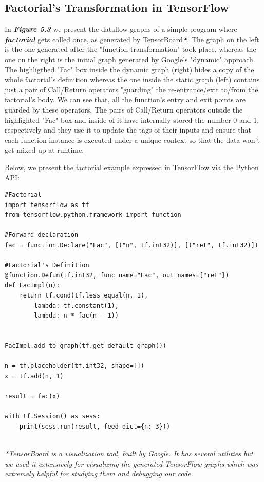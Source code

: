 \documentclass[ack,preface]{dithesis}
\begin{document}
    \subsection{Factorial's Transformation  in TensorFlow}
In  \textit{\textbf{Figure 5.3}} we present the dataflow graphs of a simple program where \textit{\textbf{factorial}} gets called once, as generated by TensorBoard\textit{\textbf{*}}. 
The graph on the left is the one generated after the "function-transformation" took place, whereas the one on the right is the initial graph generated by Google's "dynamic" approach.
The highligthed "Fac" box inside the dynamic graph (right) hides a copy of the whole factorial's definition whereas the one inside the static graph (left) contains just a pair of Call/Return operators "guarding" the re-entrance/exit to/from the  factorial's body. We can see that, all the function's entry and exit points are guarded by these operators. The pairs of Call/Return operators outside the highlighted "Fac" box and inside of it  have internally stored the number 0 and 1, respectively and they use it to update the tags of their inputs and ensure that each function-instance is executed under a unique context so that the data won't get mixed up at runtime.

Below, we present the factorial example expressed in TensorFlow  via the Python API:

\begin{lstlisting}
#Factorial
import tensorflow as tf
from tensorflow.python.framework import function

#Forward declaration
fac = function.Declare("Fac", [("n", tf.int32)], [("ret", tf.int32)])

#Factorial's Definition
@function.Defun(tf.int32, func_name="Fac", out_names=["ret"])
def FacImpl(n):
	return tf.cond(tf.less_equal(n, 1),
		lambda: tf.constant(1),
		lambda: n * fac(n - 1))


FacImpl.add_to_graph(tf.get_default_graph())

n = tf.placeholder(tf.int32, shape=[])
x = tf.add(n, 1)

result = fac(x)

with tf.Session() as sess:
	print(sess.run(result, feed_dict={n: 3}))

\end{lstlisting}

\ \\

\textit{*TensorBoard is a visualization tool, built by Google. It has several utilities but we used it extensively for visualizing the generated TensorFlow graphs which was extremely helpful for studying them and debugging our code.}
\end{document}
